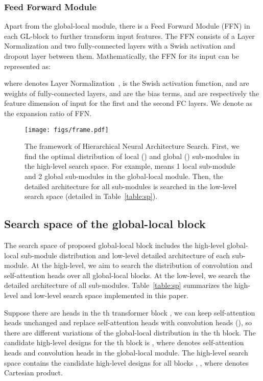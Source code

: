\documentclass[10pt,twocolumn,letterpaper]{article}
\begin{document}
\subsubsection{Feed Forward Module }
Apart from the global-local module, there is a Feed Forward Module (FFN) in each GL-block to further transform input features.
The FFN consists of a Layer Normalization and two fully-connected layers with a Swish activation and dropout layer between them.
Mathematically, the FFN  for its input  can be represented as:

where  denotes Layer Normalization~\cite{ln},  is the Swish activation function,  and  are weights of fully-connected layers,  and  are the bias terms,  and  are respectively the feature dimension of input for the first and the second FC layers. We denote  as the expansion ratio of FFN.

\begin{figure*}[htbp]
	\centering
	\texttt{[image: figs/frame.pdf]}\\
	\caption{The framework of Hierarchical Neural Architecture Search. First, we find the optimal distribution of local () and global () sub-modules in the high-level search space. For example,  means 1 local sub-module and 2 global sub-modules in the global-local module.
	Then, the detailed architecture for all sub-modules is searched in the low-level search space (detailed in Table~\ref{table:sp}).}
	\label{fig:framework}
	 \vspace{-12pt}
\end{figure*}


\subsection{Search space of the global-local block}
\label{sub:searchspace}
The search space of proposed global-local block includes the high-level global-local sub-module distribution and low-level detailed architecture of each sub-module. At the high-level, we aim to search the distribution of convolution and self-attention heads over all global-local blocks. At the low-level, we search the detailed architecture of all sub-modules.
Table~\ref{table:sp} summarizes the high-level and low-level search space implemented in this paper.

{}
Suppose there are  heads in the th transformer block , we can keep  self-attention heads unchanged and  replace  self-attention heads with convolution heads (), so there are  different variations of the global-local distribution in the th block. 
The candidate high-level designs for the th block is , where  denotes  self-attention heads and  convolution heads in the global-local module. The high-level search space contains the candidate high-level designs for all  blocks , 
{\ie }, where  denotes Cartesian product.
\end{document}
